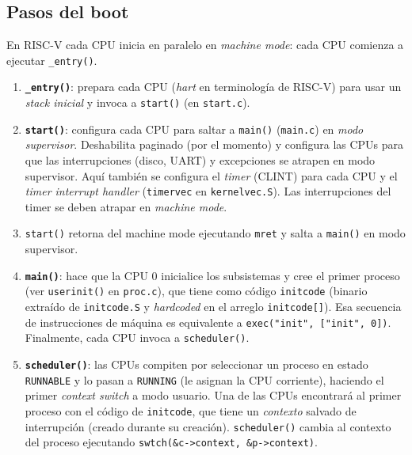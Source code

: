 \documentclass[11pt,a4paper]{article}
\begin{document}
\subsection{Pasos del boot}

\begin{importante}
En RISC-V cada CPU inicia en paralelo en \emph{machine mode}: cada CPU
comienza a ejecutar \texttt{\_entry()}.
\end{importante}

\begin{enumerate}[leftmargin=*]
    \item \textbf{\texttt{\_entry()}}: prepara cada CPU (\emph{hart} en
        terminología de RISC-V) para usar un \emph{stack inicial} y
        invoca a \texttt{start()} (en \texttt{start.c}).

    \item \textbf{\texttt{start()}}: configura cada CPU para saltar a
        \texttt{main()} (\texttt{main.c}) en \emph{modo supervisor}.
        Deshabilita paginado (por el momento) y configura las CPUs
        para que las interrupciones (disco, UART) y excepciones se
        atrapen en modo supervisor. Aquí también se configura el
        \emph{timer} (CLINT) para cada CPU y el \emph{timer interrupt
        handler} (\texttt{timervec} en \texttt{kernelvec.S}). Las
        interrupciones del timer se deben atrapar en \emph{machine
        mode}.

    \item \texttt{start()} retorna del machine mode ejecutando
        \texttt{mret} y salta a \texttt{main()} en modo supervisor.

    \item \textbf{\texttt{main()}}: hace que la CPU 0 inicialice los
        subsistemas y cree el primer proceso (ver \texttt{userinit()}
        en \texttt{proc.c}), que tiene como código
        \texttt{initcode} (binario extraído de \texttt{initcode.S} y
        \emph{hardcoded} en el arreglo \texttt{initcode[]}). Esa
        secuencia de instrucciones de máquina es equivalente a
        \verb|exec("init", ["init", 0])|. Finalmente, cada CPU
        invoca a \texttt{scheduler()}.

    \item \textbf{\texttt{scheduler()}}: las CPUs compiten por
        seleccionar un proceso en estado \texttt{RUNNABLE} y lo
        pasan a \texttt{RUNNING} (le asignan la CPU corriente),
        haciendo el primer \emph{context switch} a modo usuario. Una
        de las CPUs encontrará al primer proceso con el código de
        \texttt{initcode}, que tiene un \emph{contexto} salvado de
        interrupción (creado durante su creación).
        \texttt{scheduler()} cambia al contexto del proceso ejecutando
        \verb|swtch(&c->context, &p->context)|.


\end{enumerate}
\end{document}
